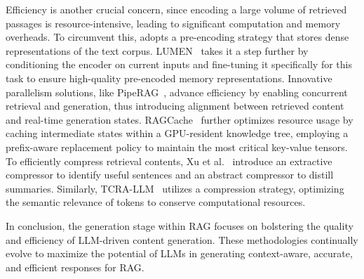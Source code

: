 \documentclass[lettersize,journal]{IEEEtran}
\begin{document}
Efficiency is another crucial concern, since encoding a large volume of retrieved passages is resource-intensive, leading to significant computation and memory overheads. To circumvent this, \cite{li2022decoupled} adopts a pre-encoding strategy that stores dense representations of the text corpus. LUMEN~\cite{de2023pre} takes it a step further by conditioning the encoder on current inputs and fine-tuning it specifically for this task to ensure high-quality pre-encoded memory representations. Innovative parallelism solutions, like PipeRAG~\cite{jiang2024piperag}, advance efficiency by enabling concurrent retrieval and generation, thus introducing alignment between retrieved content and real-time generation states. RAGCache~\cite{jin2024ragcache} further optimizes resource usage by caching intermediate states within a GPU-resident knowledge tree, employing a prefix-aware replacement policy to maintain the most critical key-value tensors. To efficiently compress retrieval contents, Xu et al.~\cite{xu2023recomp} introduce an extractive compressor to identify useful sentences and an abstract compressor to distill summaries.
Similarly, TCRA-LLM~\cite{liu2023tcra} utilizes a compression strategy, optimizing the semantic relevance of tokens to conserve computational resources.

In conclusion, the generation stage within RAG focuses on bolstering the quality and efficiency of LLM-driven content generation. These methodologies continually evolve to maximize the potential of LLMs in generating context-aware, accurate, and efficient responses for RAG.

\end{document}

